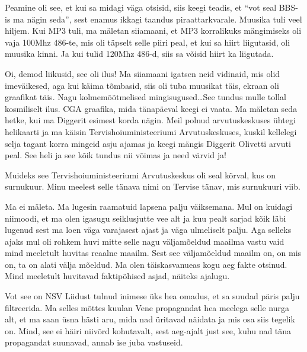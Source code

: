 Peamine oli see, et  kui sa midagi väga otsisid, siis keegi teadis, et \enquote{vot seal BBS-is ma nägin seda}, sest enamus ikkagi taandus piraattarkvarale. Muusika tuli veel hiljem. Kui MP3 tuli, ma mäletan siiamaani, et MP3 korralikuks mängimiseks oli vaja 100Mhz 486-te, mis oli täpselt selle piiri peal, et kui sa hiirt liigutasid,  oli muusika kinni. Ja kui tulid 120Mhz 486-d, siis sa võisid hiirt ka liigutada.


Oi, demod liikusid, see oli ilus! Ma siiamaani igatsen neid vidinaid, mis olid imeväikesed, aga kui käima tõmbasid, siis oli tuba muusikat täis, ekraan oli  graafikat täis. Nagu kolmemõõtmelised mingisugused\ldots See tundus mulle tollal kosmiliselt ilus. CGA graafika, mida tänapäeval keegi ei vaata. Ma mäletan seda hetke, kui ma Diggerit esimest korda nägin. Meil polnud arvutuskeskuses ühtegi helikaarti ja ma käisin Tervishoiuministeeriumi Arvutuskeskuses, kuskil  kellelegi selja tagant korra mingeid asju ajamas ja keegi mängis Diggerit Olivetti arvuti peal. See heli ja see kõik tundus nii võimas ja need värvid ja! 

Muideks see Tervishoiuministeeriumi Arvutuskeskus oli seal kõrval, kus on surnukuur. Minu meelest selle tänava nimi on Tervise tänav, mis surnukuuri viib. 


Ma ei mäleta. Ma lugesin raamatuid lapsena palju väiksemana. Mul on kuidagi niimoodi, et ma olen igasugu seiklusjutte vee alt ja kuu pealt sarjad kõik läbi lugenud sest ma loen väga varajasest ajast ja väga  ulmeliselt palju. Aga selleks ajaks mul oli rohkem huvi mitte selle nagu väljamõeldud maailma vastu vaid mind meeletult  huvitas reaalne maailm. Sest see väljamõeldud maailm on, on mis on, ta on alati välja mõeldud. Ma olen täiskasvanueas kogu aeg fakte otsinud. Mind meeletult huvitavad faktipõhised asjad, näiteks ajalugu. 


Vot see on NSV Liidust tulnud inimese üks hea omadus, et sa suudad päris palju filtreerida. Ma selles mõttes kuulan Vene propagandat hea meelega selle nurga alt, et ma saan üsna hästi aru, mida nad üritavad näidata ja mis osa siis  tegelik on. Mind, see ei häiri niivõrd kohutavalt, sest aeg-ajalt just see, kuhu nad täna propagandat suunavad,  annab ise juba vastuseid. 

